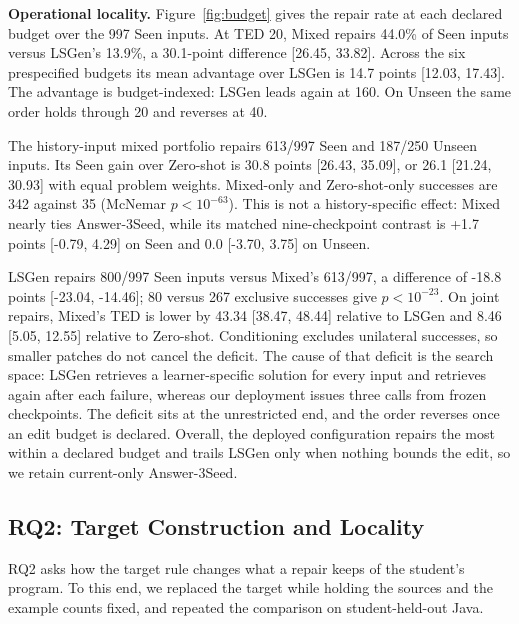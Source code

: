 \documentclass[10pt,conference]{IEEEtran}
\begin{document}
\noindent\textbf{Operational locality.} Figure~\ref{fig:budget} gives the repair rate at each declared budget over the 997 Seen inputs. At TED 20, Mixed repairs 44.0\% of Seen inputs versus LSGen's 13.9\%, a 30.1-point difference [26.45, 33.82]. Across the six prespecified budgets its mean advantage over LSGen is 14.7 points [12.03, 17.43]. The advantage is budget-indexed: LSGen leads again at 160. On Unseen the same order holds through 20 and reverses at 40.

The history-input mixed portfolio repairs 613/997 Seen and 187/250 Unseen inputs. Its Seen gain over Zero-shot is 30.8 points [26.43, 35.09], or 26.1 [21.24, 30.93] with equal problem weights. Mixed-only and Zero-shot-only successes are 342 against 35 (McNemar \(p<10^{-63}\)). This is not a history-specific effect: Mixed nearly ties Answer-3Seed, while its matched nine-checkpoint contrast is +1.7 points [-0.79, 4.29] on Seen and 0.0 [-3.70, 3.75] on Unseen.

LSGen repairs 800/997 Seen inputs versus Mixed's 613/997, a difference of -18.8 points [-23.04, -14.46]; 80 versus 267 exclusive successes give \(p<10^{-23}\). On joint repairs, Mixed's TED is lower by 43.34 [38.47, 48.44] relative to LSGen and 8.46 [5.05, 12.55] relative to Zero-shot. Conditioning excludes unilateral successes, so smaller patches do not cancel the deficit. The cause of that deficit is the search space: LSGen retrieves a learner-specific solution for every input and retrieves again after each failure, whereas our deployment issues three calls from frozen checkpoints. The deficit sits at the unrestricted end, and the order reverses once an edit budget is declared. Overall, the deployed configuration repairs the most within a declared budget and trails LSGen only when nothing bounds the edit, so we retain current-only Answer-3Seed.

\subsection{RQ2: Target Construction and Locality}
\label{sec:rq-locality}

RQ2 asks how the target rule changes what a repair keeps of the student's program. To this end, we replaced the target while holding the sources and the example counts fixed, and repeated the comparison on student-held-out Java.
\end{document}
